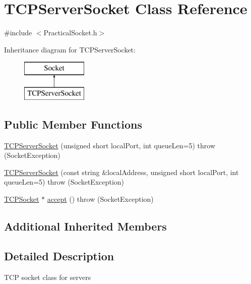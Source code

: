 \hypertarget{classTCPServerSocket}{\section{T\-C\-P\-Server\-Socket Class Reference}
\label{classTCPServerSocket}
}


{\ttfamily \#include $<$Practical\-Socket.\-h$>$}

Inheritance diagram for T\-C\-P\-Server\-Socket\-:\begin{figure}[H]
\begin{center}
\leavevmode
\includegraphics[height=2.000000cm]{classTCPServerSocket}
\end{center}
\end{figure}
\subsection*{Public Member Functions}
\begin{DoxyCompactItemize}
\item 
\hyperlink{classTCPServerSocket_ae559a3154527d09fe14a8e5ee1f53d7a}{T\-C\-P\-Server\-Socket} (unsigned short local\-Port, int queue\-Len=5)  throw (\-Socket\-Exception)
\item 
\hyperlink{classTCPServerSocket_a3908fecb1b038f7c14fcc7726f54d01d}{T\-C\-P\-Server\-Socket} (const string \&local\-Address, unsigned short local\-Port, int queue\-Len=5)  throw (\-Socket\-Exception)
\item 
\hyperlink{classTCPSocket}{T\-C\-P\-Socket} $\ast$ \hyperlink{classTCPServerSocket_a182f59f4c755e446d6bc774ef23b1cae}{accept} ()  throw (\-Socket\-Exception)
\end{DoxyCompactItemize}
\subsection*{Additional Inherited Members}


\subsection{Detailed Description}
T\-C\-P socket class for servers 

